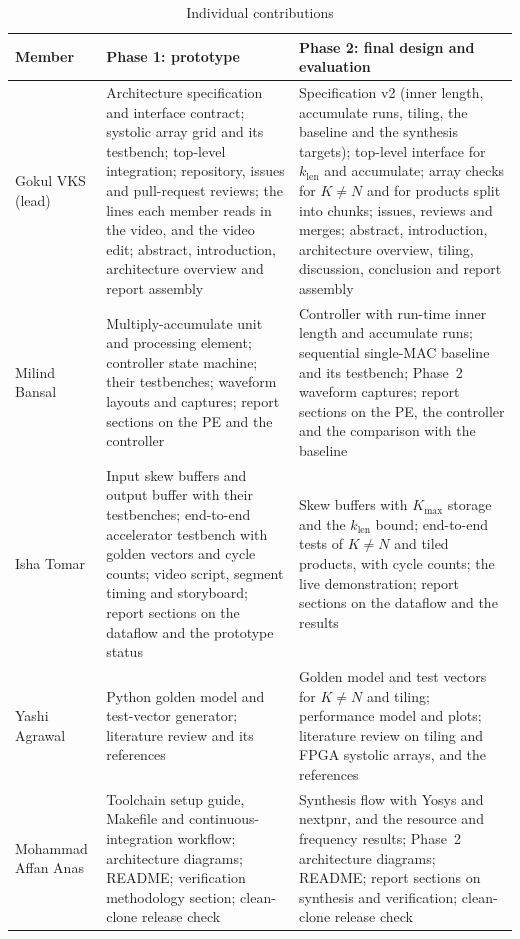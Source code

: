 \begin{table}[t]
\centering
\caption{Individual contributions}
\label{tab:contrib}
\footnotesize
\begin{tabular}{@{}>{\raggedright\arraybackslash}p{}>{\raggedright\arraybackslash}p{}>{\raggedright\arraybackslash}p{}@{}}
\toprule
Member & Phase 1: prototype & Phase 2: final design and evaluation \\
\midrule
Gokul VKS (lead) & Architecture specification and interface contract; systolic array grid and its testbench; top-level integration; repository, issues and pull-request reviews; the lines each member reads in the video, and the video edit; abstract, introduction, architecture overview and report assembly & Specification v2 (inner length, accumulate runs, tiling, the baseline and the synthesis targets); top-level interface for $k_{\mathrm{len}}$ and accumulate; array checks for $K \neq N$ and for products split into chunks; issues, reviews and merges; abstract, introduction, architecture overview, tiling, discussion, conclusion and report assembly \\
\addlinespace
Milind Bansal & Multiply-accumulate unit and processing element; controller state machine; their testbenches; waveform layouts and captures; report sections on the PE and the controller & Controller with run-time inner length and accumulate runs; sequential single-MAC baseline and its testbench; Phase~2 waveform captures; report sections on the PE, the controller and the comparison with the baseline \\
\addlinespace
Isha Tomar & Input skew buffers and output buffer with their testbenches; end-to-end accelerator testbench with golden vectors and cycle counts; video script, segment timing and storyboard; report sections on the dataflow and the prototype status & Skew buffers with $K_{\max}$ storage and the $k_{\mathrm{len}}$ bound; end-to-end tests of $K \neq N$ and tiled products, with cycle counts; the live demonstration; report sections on the dataflow and the results \\
\addlinespace
Yashi Agrawal & Python golden model and test-vector generator; literature review and its references & Golden model and test vectors for $K \neq N$ and tiling; performance model and plots; literature review on tiling and FPGA systolic arrays, and the references \\
\addlinespace
Mohammad Affan Anas & Toolchain setup guide, Makefile and continuous-integration workflow; architecture diagrams; README; verification methodology section; clean-clone release check & Synthesis flow with Yosys and nextpnr, and the resource and frequency results; Phase~2 architecture diagrams; README; report sections on synthesis and verification; clean-clone release check \\
\bottomrule
\end{tabular}
\end{table}
